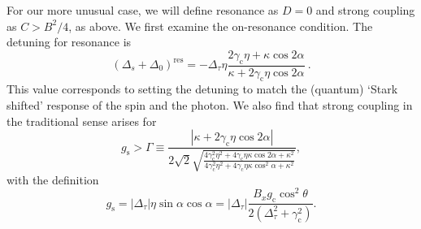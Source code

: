 \documentclass[twocolumn,english,aps,prl,preprint,reprint,showpacs,longbibliography,showkeys]{revtex4-1}
\begin{document}
For our more unusual case, we will define resonance as $D = 0$ and strong coupling as $C > B^2/4$, as above.  We first examine the on-resonance condition. The detuning for resonance is 
\begin{equation}
(\Delta_s+\Delta_0)^{\mathrm{res}}=-\Delta_{\tau}\eta\frac{2\gamma_{\mathrm{c}}\eta+\kappa \cos{2\alpha}}{\kappa+2\gamma_{\mathrm{c}}\eta \cos{2\alpha}} \ .\label{eq:resonance-condition-app}
\end{equation}
This value corresponds to setting the detuning to match the (quantum) `Stark shifted' response of the spin and the photon.
We also find that strong coupling in the traditional sense arises for
\begin{equation}
g_{\mathrm{s}}>\Gamma\equiv\frac{|\kappa+2\gamma_{\mathrm{c}}\eta \cos{2\alpha}|}{2\sqrt{2}\sqrt{\frac{4\gamma_{\mathrm{c}}^2\eta^2+4\gamma_{\mathrm{c}}\eta\kappa\cos{2\alpha}+\kappa^2}{4\gamma_{\mathrm{c}}^2\eta^2+4\gamma_{\mathrm{c}}\eta\kappa\cos^2{\alpha}+\kappa^2}}} , \label{eq:SC-condition-app}
\end{equation} 
with the definition
\begin{equation}
g_{\mathrm{s}}=|\Delta_{\tau}|\eta\sin\alpha\cos\alpha=|\Delta_{\tau}|\frac{B_x g_{\mathrm{c}}\cos^2{\theta}}{2(\Delta_{\tau}^2+\gamma_{\mathrm{c}}^2)}.
\end{equation}





\end{document}
